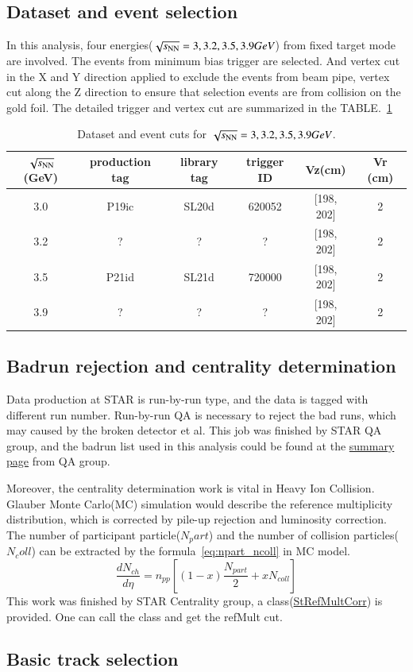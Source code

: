 \subsection{Dataset and event selection}

In this analysis, four energies($\sqrt{s_\text{NN}}=3, 3.2, 3.5, 3.9 GeV$) from fixed target mode are involved.
The events from minimum bias trigger are selected. And vertex cut in the X and Y direction applied to exclude the events from beam pipe, 
vertex cut along the Z direction to ensure that selection events are from collision on the gold foil.
The detailed trigger and vertex cut are summarized in the TABLE.~\ref{tab:dataset}
\begin{table}
\caption{Dataset and event cuts for $\sqrt{s_\text{NN}}=3, 3.2, 3.5, 3.9 GeV$.}
\label{tab:dataset}
\begin{tabular}{|c|c|c|c|c|c|}
\hline
$\sqrt{s_\text{NN}}$(GeV) & production tag & library tag & trigger ID & Vz(cm)     & Vr (cm) \\ \hline
3.0         & P19ic          & SL20d       & 620052     & [198, 202] & 2       \\ \hline
3.2         & ?          & ?       & ?     & [198, 202] & 2       \\ \hline
3.5         & P21id          & SL21d       & 720000     & [198, 202] & 2       \\ \hline
3.9         & ?          & ?       & ?     & [198, 202] & 2       \\ \hline
\end{tabular}
\end{table}


\subsection{Badrun rejection and centrality determination}

Data production at STAR is run-by-run type, and the data is tagged with different run number.
Run-by-run QA is necessary to reject the bad runs, which may caused by the broken detector et al.
This job was finished by STAR QA group, and the badrun list used in this analysis could be found at the
\href{https://drupal.star.bnl.gov/STAR/pwg/common/bes-ii-run-qa/FXT-datasets}{summary page} from QA group.

Moreover, the centrality determination work is vital in Heavy Ion Collision.
Glauber Monte Carlo(MC) simulation\cite{KHARZEEV2001121} would describe the reference multiplicity distribution, 
which is corrected by pile-up rejection and luminosity correction.
The number of participant particle($N_part$) and the number of collision particles($N_coll$)
 can be extracted by the formula~\ref{eq:npart_ncoll} in MC model.
 \begin{equation}
    \frac{d N_{c h}}{d \eta}=n_{p p}\left[(1-x) \frac{N_{p a r t}}{2}+x N_{c o l l}\right]
\label{eq:npart_ncoll}
\end{equation}
This work was finished by STAR Centrality group, a class(\href{https://github.com/star-bnl/star-sw/tree/main/StRoot/StRefMultCorr}{StRefMultCorr}) is provided.
One can call the class and get the refMult cut.


\subsection{Basic track selection}

